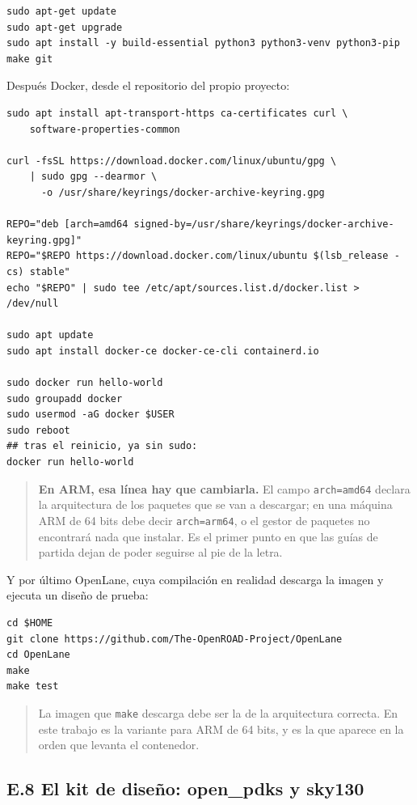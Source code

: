 \begin{verbatim}
sudo apt-get update
sudo apt-get upgrade
sudo apt install -y build-essential python3 python3-venv python3-pip make git
\end{verbatim}

Después Docker, desde el repositorio del propio proyecto:

\begin{verbatim}
sudo apt install apt-transport-https ca-certificates curl \
    software-properties-common

curl -fsSL https://download.docker.com/linux/ubuntu/gpg \
    | sudo gpg --dearmor \
      -o /usr/share/keyrings/docker-archive-keyring.gpg

REPO="deb [arch=amd64 signed-by=/usr/share/keyrings/docker-archive-keyring.gpg]"
REPO="$REPO https://download.docker.com/linux/ubuntu $(lsb_release -cs) stable"
echo "$REPO" | sudo tee /etc/apt/sources.list.d/docker.list > /dev/null

sudo apt update
sudo apt install docker-ce docker-ce-cli containerd.io

sudo docker run hello-world
sudo groupadd docker
sudo usermod -aG docker $USER
sudo reboot
## tras el reinicio, ya sin sudo:
docker run hello-world
\end{verbatim}

\begin{quote}
\textbf{En ARM, esa línea hay que cambiarla.} El campo
\texttt{arch=amd64} declara la arquitectura de los paquetes que se van a
descargar; en una máquina ARM de 64 bits debe decir \texttt{arch=arm64},
o el gestor de paquetes no encontrará nada que instalar. Es el primer
punto en que las guías de partida dejan de poder seguirse al pie de la
letra.
\end{quote}

Y por último OpenLane, cuya compilación en realidad descarga la imagen y
ejecuta un diseño de prueba:

\begin{verbatim}
cd $HOME
git clone https://github.com/The-OpenROAD-Project/OpenLane
cd OpenLane
make
make test
\end{verbatim}

\begin{quote}
La imagen que \texttt{make} descarga debe ser la de la arquitectura
correcta. En este trabajo es la variante para ARM de 64 bits, y es la
que aparece en la orden que levanta el contenedor.
\end{quote}

\subsection{E.8 El kit de diseño: open\_pdks y
sky130}\label{e.8-el-kit-de-diseuxf1o-open_pdks-y-sky130}

